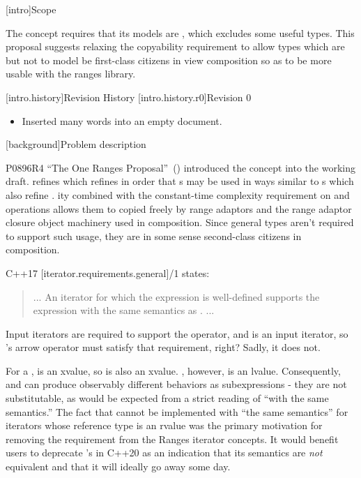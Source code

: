 [intro]{Scope}

The  concept requires that its models are , which
excludes some useful  types. This proposal suggests relaxing the
copyability requirement to allow  types which are 
but not  to model  be first-class citizens in
view composition so as to be more usable with the ranges library.

[intro.history]{Revision History}
[intro.history.r0]{Revision 0}
\begin{itemize}
\item Inserted many words into an empty document.
\end{itemize}

[background]{Problem description}


P0896R4 ``The One Ranges Proposal''~(\cite{p0896}) introduced the 
concept into the \Cpp working draft.  refines 
which refines  in order that s may be used in ways
similar to s which also refine .
ity combined with the constant-time complexity requirement on
 and  operations allows them to copied freely by
range adaptors and the range adaptor closure object machinery used in
 composition. Since general  types aren't required to
support such usage, they are in some sense second-class citizens in 
composition.


C++17 [iterator.requirements.general]/1 states:
\begin{quote}
... An iterator  for which the expression  is well-defined
supports the expression  with the same semantics as . ...
\end{quote}
Input iterators are required to support the \tcode{->}
operator,
and  is an input iterator,
so 's arrow operator must satisfy that requirement, right?
Sadly, it does not.

For a ,  is an xvalue, so  is also
an xvalue. , however, is an lvalue. Consequently,  and
 can produce observably different behaviors as subexpressions - they
are not substitutable, as would be expected from a strict reading of ``with the
same semantics.'' The fact that \tcode{->} cannot be implemented with ``the same
semantics'' for iterators whose reference type is an rvalue was the primary
motivation for removing the \tcode{->} requirement from the Ranges iterator
concepts. It would benefit users to deprecate 's
 in C++20 as an indication that its semantics are \textit{not}
equivalent and that it will ideally go away some day.

